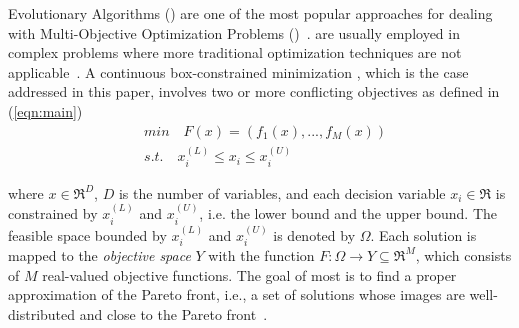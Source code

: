  Evolutionary Algorithms (\MOEAS{}) are one of the most popular approaches 
for dealing with Multi-Objective Optimization Problems (\MOPS{})~\cite{das2011real, zhou2011multiobjective}.
%
\MOEAS{} are usually employed in complex problems where more traditional optimization techniques are not 
applicable~\cite{Lootsma:99}.
%
A continuous box-constrained minimization \MOP{}, which is the case addressed in this paper,
involves two or more conflicting objectives as defined in (\ref{eqn:main})
%
\begin{equation}\label{eqn:main}
\begin{split}
&min \quad F(x) = (f_1(x), ..., f_M(x)) \\
&s.t. \quad x_i^{(L)} \leq x_i \leq x_i^{(U)}
\end{split}
\end{equation}

where $x \in \Re^D$, $D$ is the number of variables,
and each decision variable $x_i \in \Re$ is constrained by $x_i^{(L)}$ and $x_i^{(U)}$, 
i.e. the lower bound and the upper bound.
The feasible space bounded by $x_i^{(L)}$ and $x_i^{(U)}$ is denoted by $\Omega$.
Each solution is mapped to the \textit{objective space} $Y$ with the function $F: \Omega \rightarrow Y \subseteq \Re^M$, 
which consists of $M$ real-valued objective functions.
%
%
%
%
%
%
The goal of most \MOEAS{} is to find a proper approximation of the Pareto front, i.e., a set of
solutions whose images are well-distributed and close to the Pareto front~\cite{trivedi2016survey}.
%

